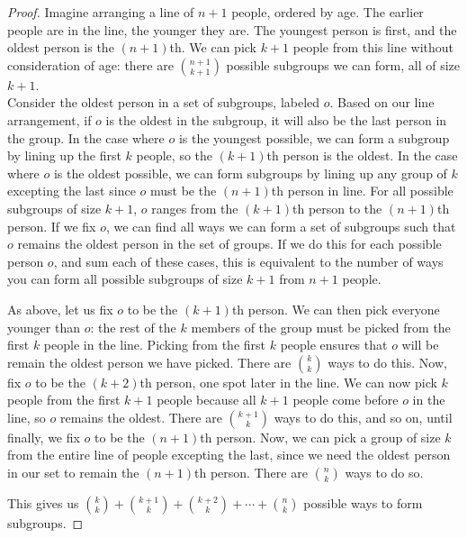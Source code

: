\documentclass[10pt]{article}
\begin{document}
\begin{proof}[Proof]

Imagine arranging a line of $n+1$ people, ordered by age. The earlier people are in the line, the younger they are. The youngest person is first, and the oldest person is the $(n+1)$th. We can pick $k+1$ people from this line without consideration of age: there are \(\binom{n+1}{k+1}\) possible subgroups we can form, all of size $k+1$. \\

Consider the oldest person in a set of subgroups, labeled $o$. Based on our line arrangement, if $o$ is the oldest in the subgroup, it will also be the last person in the group. In the case where $o$ is the youngest possible, we can form a subgroup by lining up the first $k$ people, so the $(k+1)$th person is the oldest. In the case where $o$ is the oldest possible, we can form subgroups by lining up any group of $k$ excepting the last since $o$ must be the $(n+1)$th person in line. For all possible subgroups of size $k+1$, $o$ ranges from the $(k+1)$th person to the $(n+1)$th person. If we fix $o$, we can find all ways we can form a set of subgroups such that $o$ remains the oldest person in the set of groups. If we do this for each possible person $o$, and sum each of these cases, this is equivalent to the number of ways you can form all possible subgroups of size $k+1$ from $n+1$ people.

As above, let us fix $o$ to be the $(k+1)$th person. We can then pick everyone younger than $o$: the rest of the $k$ members of the group must be picked from the first $k$ people in the line. Picking from the first $k$ people ensures that $o$ will be remain the oldest person we have picked. There are \(\binom{k}{k}\) ways to do this. Now, fix $o$ to be the $(k+2)$th person, one spot later in the line. We can now pick $k$ people from the first $k+1$ people because all $k+1$ people come before $o$ in the line, so $o$ remains the oldest. There are \(\binom{k + 1}{k}\) ways to do this, and so on, until finally, we fix $o$ to be the $(n+1)$th person. Now, we can pick a group of size $k$ from the entire line of people excepting the last, since we need the oldest person in our set to remain the $(n+1)$th person. There are \(\binom{n}{k}\) ways to do so.

This gives us \(\binom{k}{k} + \binom{k + 1}{k} + \binom{k + 2}{k} + \cdots + \binom{n}{k}\) possible ways to form subgroups.

\end{proof}
\end{document}
